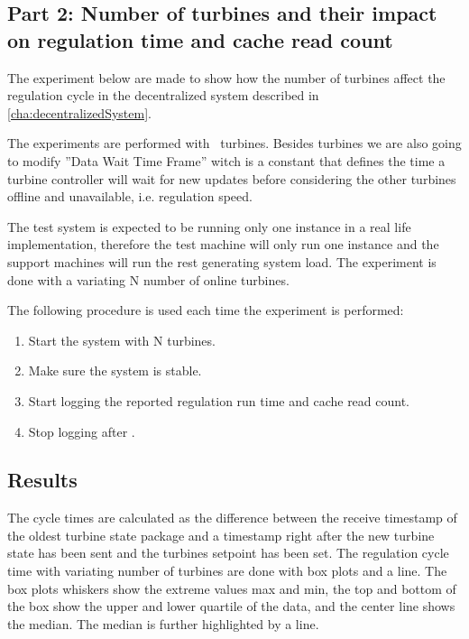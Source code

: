 \subsection{Part 2: Number of turbines and their impact on regulation time and cache read count}
\label{subsec:Exper:perfom:2}
The experiment below are made to show how the number of turbines affect the regulation cycle in the decentralized system described in \cref{cha:decentralizedSystem}.

The experiments are performed with \testTurbineNumbers ~turbines. Besides turbines we are also going to modify ''Data Wait Time Frame'' witch is a constant that defines the time a turbine controller will wait for new updates before considering the other turbines offline and unavailable, i.e. regulation speed.

The test system is expected to be running only one instance in a real life implementation, therefore the test machine will only run one instance and the support machines will run the rest generating system load.
The experiment is done with a variating N number of online turbines.

The following procedure is used each time the experiment is performed:
\begin{enumerate}
	\item Start the system with N turbines.
	\item Make sure the system is stable.
	\item Start logging the reported regulation run time and cache read count.
	\item Stop logging after \experiemntRunTime.
\end{enumerate}


\subsection{Results}

\label{sec:exp:performance}
The cycle times are calculated as the difference between the receive timestamp of the oldest turbine state package and a timestamp right after the new turbine state has been sent and the turbines setpoint has been set.
The regulation cycle time with variating number of turbines are done with box plots and a line. The box plots whiskers show the extreme values max and min, the top and bottom of the box show the upper and lower quartile of the data, and the center line shows the median. The median is further highlighted by a line.

\subsubsection{}


